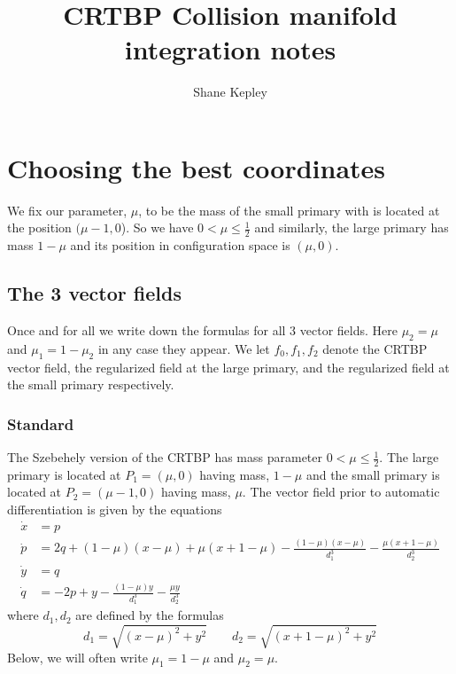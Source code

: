 \documentclass[10pt]{article}
\newcommand{\paren}[1]{\left( #1 \right)}
\begin{document}
\title{CRTBP Collision manifold integration notes}%
\author{Shane Kepley}
\date{}
\maketitle


\section{Choosing the best coordinates}

We fix our parameter, $\mu$, to be the mass of the small primary with is located at the position $(\mu-1, 0$). So we have $0 < \mu \leq \frac{1}{2}$ and similarly, the large primary has mass $1 - \mu$ and its position in configuration space is $(\mu, 0)$.
\subsection{The 3 vector fields}
Once and for all we write down the formulas for all 3 vector fields. Here $\mu_2 = \mu$ and  $\mu_1 = 1- \mu_2$ in any case they appear. We let $f_0, f_1, f_2$ denote the CRTBP vector field, the regularized field at the large primary, and the regularized field at the small primary respectively.
\subsubsection{Standard}
The Szebehely version of the CRTBP has mass parameter $0 < \mu \leq \frac{1}{2}$. The large primary is located at $P_1 = (\mu, 0)$ having mass, $1 - \mu$ and the small primary is located at $P_2 = (\mu - 1, 0)$ having mass, $\mu$. The vector field prior to automatic differentiation is given by the equations
\begin{align*}
	\dot x & = p \\
	\dot p & = 2q + \left(1 - \mu\right)\left(x - \mu\right) + \mu\left(x + 1 - \mu\right) - \frac{\paren{1 - \mu} \paren{x - \mu}}{d_1^3} - \frac{\mu \paren{x + 1 - \mu}}{d_2^3} \\
	\dot y &= q \\
	\dot q & = - 2p + y - \frac{\paren{1-\mu}y}{d_1^3} - \frac{\mu y}{d_2^3}
\end{align*} 
where $d_1, d_2$ are defined by the formulas
\[
d_1 = \sqrt{\paren{x - \mu}^2 + y^2} \qquad d_2 = \sqrt{\paren{x + 1 - \mu}^2 + y^2}
\]
Below, we will often write $\mu_1 = 1 - \mu$ and $\mu_2 = \mu$. 
\end{document}
